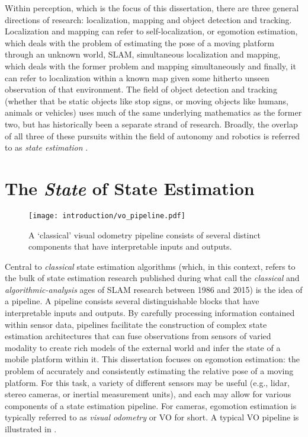  Within perception, which is the focus of this dissertation, there are three general directions of research: localization, mapping and object detection and tracking. Localization and mapping can refer to self-localization, or egomotion estimation, which deals with the problem of estimating the pose of a moving platform through an unknown world, SLAM, simultaneous localization and mapping, which deals with the former problem and mapping simultaneously and finally, it can refer to localization within a known map given some hitherto unseen observation of that environment. The field of object detection and tracking (whether that be static objects like stop signs, or moving objects like humans, animals or vehicles) uses much of the same underlying mathematics as the former two, but has historically been a separate strand of research. Broadly, the overlap of all three of these pursuits within the field of autonomy and robotics is referred to as \textit{state estimation} \citep{Barfoot2017-ri}.  


\section{The \textit{State} of State Estimation}

\begin{figure}
\begin{center}
		\texttt{[image: introduction/vo\_pipeline.pdf]}
		\caption{A `classical' visual odometry pipeline consists of several distinct components that have interpretable inputs and outputs.}
  	\label{fig:intro_vo_pipeline}
\end{center}
\end{figure}


Central to \textit{classical} state estimation algorithms (which, in this context, refers to the bulk of state estimation research published during what \cite{Cadena2016-ds} call the \textit{classical} and \textit{algorithmic-analysis} ages of SLAM research between 1986 and 2015) is the idea of a pipeline. A pipeline consists several distinguishable blocks that have interpretable inputs and outputs.  By carefully processing information contained within sensor data, pipelines facilitate the construction of complex state estimation architectures that can fuse observations from sensors of varied modality to create rich models of the external world and infer the state of a mobile platform within it. This dissertation focuses on egomotion estimation: the problem of accurately and consistently estimating the relative pose of a moving platform. For this task, a variety of different sensors may be useful (e.g., lidar, stereo cameras, or inertial measurement units), and each may allow for various components of a state estimation pipeline. For cameras, egomotion estimation is typically referred to as \textit{visual odometry} or VO for short. A typical VO pipeline is illustrated in . 




